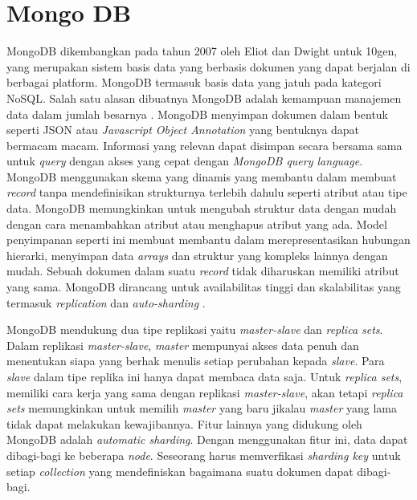 \section{Mongo DB}
MongoDB dikembangkan pada tahun 2007 oleh Eliot dan Dwight untuk 10gen, yang merupakan sistem basis data yang berbasis dokumen yang dapat berjalan di berbagai platform. MongoDB termasuk basis data yang jatuh pada kategori NoSQL. Salah satu alasan dibuatnya MongoDB adalah kemampuan manajemen data dalam jumlah besarnya \citep{mongoarchitecture}.  MongoDB menyimpan dokumen dalam bentuk seperti JSON atau \textit{Javascript Object Annotation} yang bentuknya dapat bermacam macam. Informasi yang relevan dapat disimpan secara bersama sama untuk \textit{query} dengan akses yang cepat dengan \textit{MongoDB query language}. MongoDB menggunakan skema yang dinamis yang membantu dalam membuat \textit{record} tanpa mendefinisikan strukturnya terlebih dahulu seperti atribut atau tipe data. MongoDB memungkinkan untuk mengubah struktur data dengan mudah dengan cara menambahkan atribut atau menghapus atribut yang ada. Model penyimpanan seperti ini membuat membantu dalam merepresentasikan hubungan hierarki, menyimpan data \textit{arrays} dan struktur yang kompleks lainnya dengan mudah. Sebuah dokumen dalam suatu \textit{record} tidak diharuskan memiliki atribut yang sama. MongoDB dirancang untuk availabilitas tinggi dan skalabilitas yang termasuk \textit{replication} dan \textit{auto-sharding} \citep{mongoarchitecture2}.

MongoDB mendukung dua tipe replikasi yaitu \textit{master-slave} dan \textit{replica sets}. Dalam replikasi \textit{master-slave}, \textit{master} mempunyai akses data penuh dan menentukan siapa yang berhak menulis setiap perubahan kepada \textit{slave}. Para \textit{slave} dalam tipe replika ini hanya dapat membaca data saja. Untuk \textit{replica sets}, memiliki cara kerja yang sama dengan replikasi \textit{master-slave}, akan tetapi \textit{replica sets} memungkinkan untuk memilih \textit{master} yang baru jikalau \textit{master} yang lama tidak dapat melakukan kewajibannya. Fitur lainnya yang didukung oleh MongoDB adalah \textit{automatic sharding}. Dengan menggunakan fitur ini, data dapat dibagi-bagi ke beberapa \textit{node}. Seseorang harus memverfikasi \textit{sharding key} untuk setiap \textit{collection} yang mendefiniskan bagaimana suatu dokumen dapat dibagi-bagi. \citep{mongoarchitecture2}

